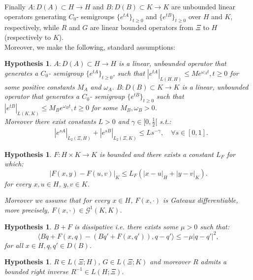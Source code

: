 \documentclass[reqno,a4paper,11 pt]{article}
\newtheorem{hypothesis}[theorem]{Hypothesis}
\newtheorem{remark}[theorem]{Remark}
\numberwithin{equation}{section}
\begin{document}
Finally $A: D(A)\subset H \to
H$ and $B: D(B) \subset K \to K$ are unbounded linear operators
generating $C_0$- semigroups $\{ e^{tA} \}_{t \ge 0}$ and $\{
e^{tB} \}_{t \ge 0}$ over $H$
and $K$, respectively, while  $R$ and $G$ are linear bounded operators from $\Xi$ to $H$ (respectively to $K$). \\
Moreover, we make the following, standard assumptions:
\begin{hypothesis}\label{A.1}
$A: D(A)\subset H \to H$
is a 
linear, unbounded  operator that generates a  $C_0$- semigroup $\{
e^{tA} \}_{t \geq 0}$, such that  $|e^{tA}|_{L(H,H)} \le M e ^{ \omega_A t},  t \geq 0$ for some positive constants $M_A$ and $\omega_A$.
$B: D(B)\subset K \to K$ is a 
linear, unbounded  operator that generates a  $C_0$- semigroup $\{ e^{tB} \}_{t \ge 0}$ such that $|e^{tB}|_{L(K,K)} \le   M_B e ^{ \omega_B t}, t \geq 0$
 for some $ M_B, \omega_B>0$. \\
Moreover there exist  constants $L>0$ and $\gamma \in [0,\frac{1}{2}[$ s.t.:
\begin{align}
&|e^{sA}|_{L_2(\Xi,H)}+ |e^{sB}|_{L_2(\Xi,K)}\nonumber \leq L
s^{-\gamma},\quad \forall s\in [0,1].\nonumber 
\end{align}

\end{hypothesis}
\begin{hypothesis}\label{A.2}
$F:  H
\times K \to K$ is bounded and there exists a constant $L_F$ for which:
\begin{equation}
| F(x,y)-
F(u,v)| _K \leq L_F( |x-u|_H + |y-v|_K).\nonumber 
\end{equation}
 for every $x,u
\in H$, $y,v \in K$.

Moreover we assume that for every $x \in H$, $F (x,\cdot)$ is Gateaux differentiable, more precisely, $F (x,\cdot) \in \mathcal{G}^1(K,K)$.

\end{hypothesis}
\begin{hypothesis}\label{A.3} $B +F$ is  dissipative i.e.
there exists some $\mu >0$ such that:
\[ \langle B q+F (x,q) - (Bq' +F(x,q')), q-q' \rangle
 \leq -\mu |q-q'|^2, \]
for all $
x\in H,
 q,q' \in D(B)$.
\end{hypothesis}
\begin{hypothesis}
 \label{A.4}  $R \in L(\Xi;H)$, $G \in {L}(\Xi;K)$ and  moreover $R$ admits a bounded right inverse $R^{-1}\in L(H;\Xi)$.
\end{hypothesis}
\end{document}
